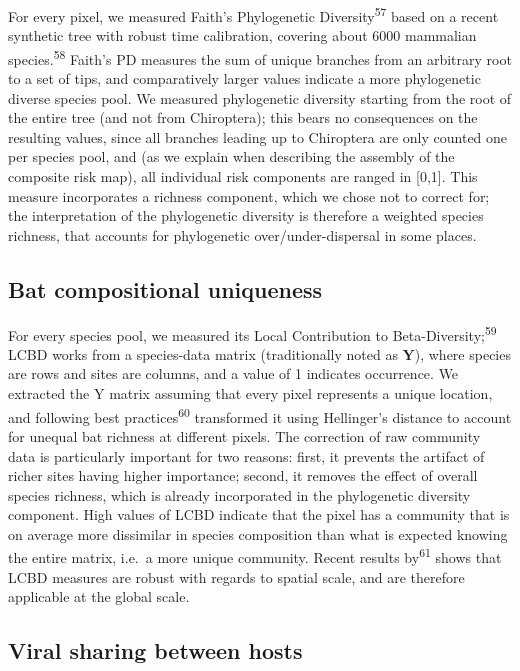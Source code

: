 \documentclass[10pt,oneside]{article}
\begin{document}
For every pixel, we measured Faith's Phylogenetic
Diversity\textsuperscript{57} based on a recent synthetic tree with
robust time calibration, covering about 6000 mammalian
species.\textsuperscript{58} Faith's PD measures the sum of unique
branches from an arbitrary root to a set of tips, and comparatively
larger values indicate a more phylogenetic diverse species pool. We
measured phylogenetic diversity starting from the root of the entire
tree (and not from Chiroptera); this bears no consequences on the
resulting values, since all branches leading up to Chiroptera are only
counted one per species pool, and (as we explain when describing the
assembly of the composite risk map), all individual risk components are
ranged in {[}0,1{]}. This measure incorporates a richness component,
which we chose not to correct for; the interpretation of the
phylogenetic diversity is therefore a weighted species richness, that
accounts for phylogenetic over/under-dispersal in some places.

\hypertarget{bat-compositional-uniqueness}{%
\subsection{Bat compositional
uniqueness}\label{bat-compositional-uniqueness}}

For every species pool, we measured its Local Contribution to
Beta-Diversity;\textsuperscript{59} LCBD works from a species-data
matrix (traditionally noted as \(\mathbf{Y}\)), where species are rows
and sites are columns, and a value of 1 indicates occurrence. We
extracted the Y matrix assuming that every pixel represents a unique
location, and following best practices\textsuperscript{60} transformed
it using Hellinger's distance to account for unequal bat richness at
different pixels. The correction of raw community data is particularly
important for two reasons: first, it prevents the artifact of richer
sites having higher importance; second, it removes the effect of overall
species richness, which is already incorporated in the phylogenetic
diversity component. High values of LCBD indicate that the pixel has a
community that is on average more dissimilar in species composition than
what is expected knowing the entire matrix, i.e.~a more unique
community. Recent results by\textsuperscript{61} shows that LCBD
measures are robust with regards to spatial scale, and are therefore
applicable at the global scale.

\hypertarget{viral-sharing-between-hosts}{%
\subsection{Viral sharing between
hosts}\label{viral-sharing-between-hosts}}
\end{document}
